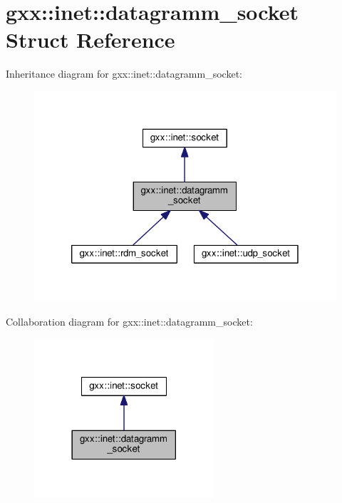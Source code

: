 \hypertarget{structgxx_1_1inet_1_1datagramm__socket}{}\section{gxx\+:\+:inet\+:\+:datagramm\+\_\+socket Struct Reference}
\label{structgxx_1_1inet_1_1datagramm__socket}


Inheritance diagram for gxx\+:\+:inet\+:\+:datagramm\+\_\+socket\+:
\nopagebreak
\begin{figure}[H]
\begin{center}
\leavevmode
\includegraphics[width=320pt]{structgxx_1_1inet_1_1datagramm__socket__inherit__graph}
\end{center}
\end{figure}


Collaboration diagram for gxx\+:\+:inet\+:\+:datagramm\+\_\+socket\+:
\nopagebreak
\begin{figure}[H]
\begin{center}
\leavevmode
\includegraphics[width=189pt]{structgxx_1_1inet_1_1datagramm__socket__coll__graph}
\end{center}
\end{figure}
